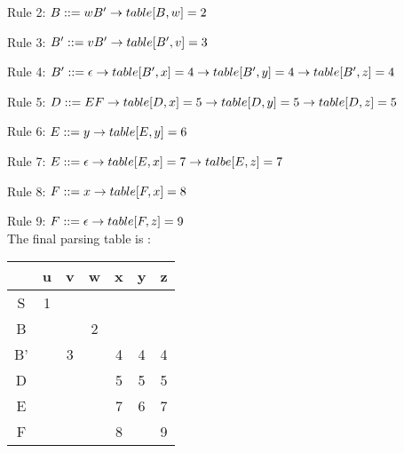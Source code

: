           Rule 2: $B::= wB'\\
            \rightarrow table[B,w] = 2$
            
          Rule 3: $B'::= vB'\\
            \rightarrow table[B',v] = 3$
            
          Rule 4: $B'::= \epsilon\\
            \rightarrow table[B',x] = 4\\
            \rightarrow table[B',y] = 4\\
            \rightarrow table[B',z] = 4$
            
          Rule 5: $D::= EF\\
            \rightarrow table[D,x] = 5\\
            \rightarrow table[D,y] = 5\\
            \rightarrow table[D,z] = 5$
            
          Rule 6: $E::= y\\
            \rightarrow table[E,y] = 6$
            
          Rule 7: $E::= \epsilon\\
            \rightarrow table[E,x] = 7\\
            \rightarrow talbe[E,z] = 7$
            
          Rule 8: $F::= x\\
            \rightarrow table[F,x] = 8$
            
          Rule 9: $F::= \epsilon\\
            \rightarrow table[F,z] = 9$\\
            The final parsing table is :
            \begin{center}
           
            \begin{tabular}{ |c|c|c|c|c|c|c|}
                \hline
                & u & v & w & x & y & z \\ \hline                        
                S & 1 & & & & & \\ \hline
                B & & & 2 & & & \\ \hline
                B' & & 3 & & 4 & 4 & 4 \\ \hline
                D & & & & 5 & 5 & 5 \\ \hline
                E & & & & 7 & 6 & 7 \\ \hline
                F & & & & 8 & & 9 \\
                \hline
            \end{tabular}
                        \end{center}
  
